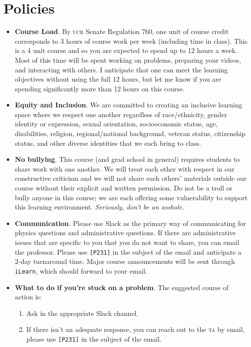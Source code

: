 \documentclass[12pt]{article}
\numberwithin{equation}{section}    %
\begin{document}
\section*{Policies}

\begin{itemize}
	\item \textbf{Course Load}. By \textsc{ucr} Senate Regulation 760, one unit of course credit corresponds to 3 hours of course work per week (including time in class). This is a 4 unit course and so you are expected to spend up to 12 hours a week. Most of this time will be spent working on problems, preparing your videos, and interacting with others. I anticipate that one can meet the learning objectives without using the full 12 hours, but let me know if you are spending significantly more than 12 hours on this course.
	\item \textbf{Equity and Inclusion}. We are committed to creating an inclusive learning space where we respect one another regardless of race/ethnicity, gender identity or expression, sexual orientation, socioeconomic status, age, disabilities, religion, regional/national background, veteran status, citizenship status, and other diverse identities that we each bring to class.
	\item \textbf{No bullying}. This course (and grad school in general) requires students to share work with one another. We will treat each other with respect in our constructive criticism and we will not share each others' materials outside our course without their explicit and written permission. Do not be a troll or bully anyone in this course; we are each offering some vulnerability to support this learning environment.  \emph{Seriously, don't be an asshole.}
	\item \textbf{Communication}. Please use Slack as the primary way of communicating for physics questions and administrative questions. If there are administrative issues that are specific to you that you do not want to share, you can email the professor. Please use \texttt{[P231]} in the subject of the email and anticipate a 2-day turnaround time. Major course announcements will be sent through \texttt{iLearn}, which should forward to your email.
	\item \textbf{What to do if you're stuck on a problem}. The suggested course of action is:
	\begin{enumerate}
		\item Ask in the appropriate Slack channel. 
		\item If there isn't an adequate response, you can reach out to the \textsc{ta} by email, please use \texttt{[P231]} in the subject of the email.

\end{enumerate}
\end{itemize}
\end{document}
